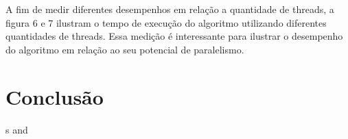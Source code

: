 \documentclass[12pt]{article}
\begin{document}
A fim de medir diferentes desempenhos em relação a quantidade de threads, a figura 6 e 7 ilustram o tempo de execução do algoritmo utilizando diferentes quantidades de threads. Essa medição é interessante para ilustrar o desempenho do algoritmo em relação ao seu potencial de paralelismo. 





\section{Conclusão}

{\color{gray}\lipsum[1]}

\cite{Sedgewick:2011} s \cite{Cormen:2009} and \cite{Grama:2003}




\end{document}
